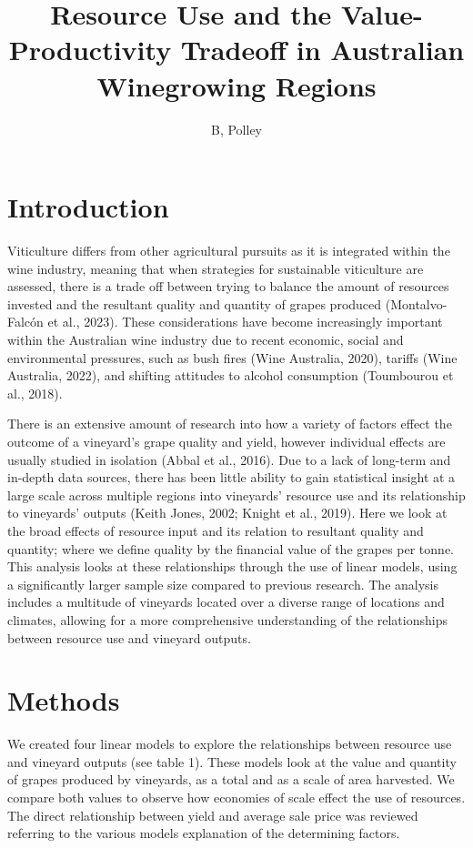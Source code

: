 \documentclass[
  journal=large,
  manuscript=article-type,
  year=2023,
  volume=?,
]{cup-journal}
\title{Resource Use and the Value-Productivity Tradeoff in Australian Winegrowing Regions}
\author{B, Polley}
\affiliation{Queensland University of Technology, Australian Wine Research Institute, Adelaide, 5047, South Australia, Australia}
\begin{document}
\section{Introduction}
Viticulture differs from other agricultural pursuits as it is integrated within the wine industry, meaning that when strategies for sustainable viticulture are assessed, there is a trade off between trying to balance the amount of resources invested and the resultant quality and quantity of grapes produced (Montalvo-Falcón et al., 2023). These considerations have become increasingly important within the Australian wine industry due to recent economic, social and environmental pressures, such as bush fires (Wine Australia, 2020), tariffs (Wine Australia, 2022), and shifting attitudes to alcohol consumption (Toumbourou et al., 2018).

There is an extensive amount of research into how a variety of factors effect the outcome of a vineyard’s grape quality and yield, however individual effects are usually studied in isolation (Abbal et al., 2016). Due to a lack of long-term and in-depth data sources, there has been little ability to gain statistical insight at a large scale across multiple regions into vineyards’ resource use and its relationship to vineyards’ outputs (Keith Jones, 2002; Knight et al., 2019). Here we look at the broad effects of resource input and its relation to resultant quality and quantity; where we define quality by the financial value of the grapes per tonne. This analysis looks at these relationships through the use of linear models, using a significantly larger sample size compared to previous research. The analysis includes a multitude of vineyards located over a diverse range of locations and climates, allowing for a more comprehensive understanding of the relationships between resource use and vineyard outputs.

\section{Methods}
We created four linear models to explore the relationships between resource use and vineyard outputs (see table 1). These models look at the value and quantity of grapes produced by vineyards, as a total and as a scale of area harvested. We compare both values to observe how economies of scale effect the use of resources. The direct relationship between yield and average sale price was reviewed referring to the various models explanation of the determining factors.
\end{document}
